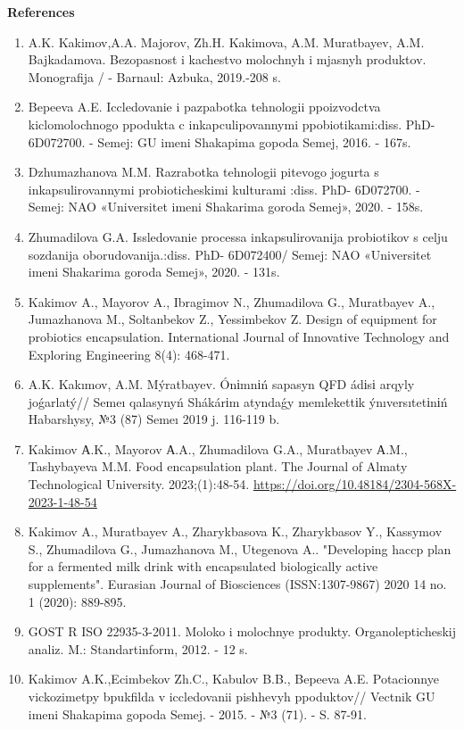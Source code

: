 \begin{center}
{\bfseries References}
\end{center}

\begin{enumerate}
\item
A.K. Kakimov,A.A. Majorov, Zh.H. Kakimova, A.M. Muratbayev, A.M.
Bajkadamova. Bezopasnost\textquotesingle{} i kachestvo molochnyh i
mjasnyh produktov. Monografija / - Barnaul: Azbuka, 2019.-208 s.

\item
Bepeeva A.E. Iccledovanie i pazpabotka tehnologii ppoizvodctva
kiclomolochnogo ppodukta c inkapculipovannymi
ppobiotikami:diss. PhD- 6D072700. - Semej: GU imeni Shakapima
gopoda Semej, 2016. - 167s.

\item
Dzhumazhanova M.M. Razrabotka tehnologii pit\textquotesingle evogo
jogurta s inkapsulirovannymi probioticheskimi kul\textquotesingle turami
:diss. PhD- 6D072700. - Semej: NAO «Universitet imeni Shakarima
goroda Semej», 2020. - 158s.

\item
Zhumadilova G.A. Issledovanie processa inkapsulirovanija probiotikov
s cel\textquotesingle ju sozdanija oborudovanija.:diss. PhD-
6D072400/ Semej: NAO «Universitet imeni Shakarima goroda Semej», 2020.
- 131s.

\item
Kakimov A., Mayorov A., Ibragimov N., Zhumadilova G., Muratbayev A.,
Jumazhanova M., Soltanbekov Z., Yessimbekov Z. Design of equipment for
probiotics encapsulation. International Journal of Innovative Technology
and Exploring Engineering 8(4): 468-471.

\item
A.K. Kakımov, A.M. Mýratbayev. Ónіmnіń sapasyn QFD ádіsі arqyly
joǵarlatý// Semeı qalasynyń Shákárіm atyndaǵy memlekettіk
ýnıversıtetіnіń Habarshysy, №3 (87) Semeı 2019 j. 116-119 b.

\item
Kakimov А.K., Mayorov А.A., Zhumadilova G.A., Muratbayev А.M.,
Tashybayeva M.M. Food encapsulation plant. The Journal of Almaty
Technological University. 2023;(1):48-54.
\href{https://doi.org/10.48184/2304-568X-2023-1-48-54}{https://doi.org/10.48184/2304-568X-2023-1-48-54}

\item
Kakimov A., Muratbayev A., Zharykbasova K., Zharykbasov Y., Kassymov
S., Zhumadilova G., Jumazhanova M., Utegenova A.. "Developing haccp plan
for a fermented milk drink with encapsulated biologically active
supplements". Eurasian Journal of Biosciences (ISSN:1307-9867) 2020 14
no. 1 (2020): 889-895.

\item
GOST R ISO 22935-3-2011. Moloko i molochnye produkty.
Organolepticheskij analiz. M.: Standartinform, 2012. - 12 s.

\item
Kakimov A.K.,Ecimbekov Zh.C., Kabulov B.B., Bepeeva A.E. Potacionnye
vickozimetpy bpukfil\textquotesingle da v iccledovanii pishhevyh
ppoduktov// Vectnik GU imeni Shakapima gopoda Semej. - 2015. - №3 (71).
- S. 87-91.
\end{enumerate}

